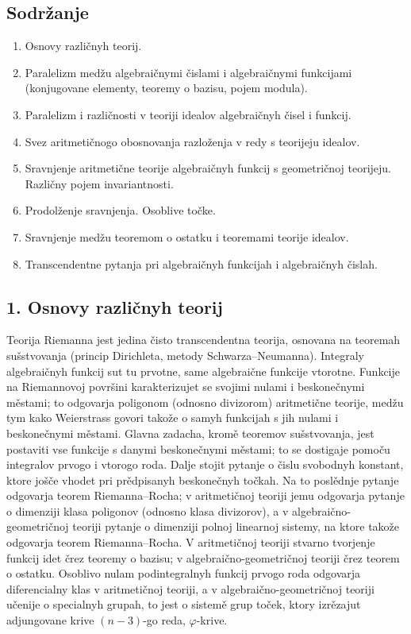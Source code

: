 \documentclass[11pt]{article}
\begin{document}
\subsection*{Sodržanje}
\begin{enumerate}
\item Osnovy različnyh teorij.
\item Paralelizm medžu algebraičnymi čislami i algebraičnymi funkcijami (konjugovane elementy, teoremy o bazisu, pojem modula).
\item Paralelizm i različnosti v teoriji idealov algebraičnyh čisel i funkcij.
\item Svez aritmetičnogo obosnovanja razloženja v redy s teorijeju idealov.
\item Sravnjenje aritmetične teorije algebraičnyh funkcij s geometričnoj teorijeju. Različny pojem invariantnosti.
\item Prodolženje sravnjenja. Osoblive točke.
\item Sravnjenje medžu teoremom o ostatku i teoremami teorije idealov.
\item Transcendentne pytanja pri algebraičnyh funkcijah i algebraičnyh čislah.
\end{enumerate}

\subsection*{1. Osnovy različnyh teorij}
Teorija Riemanna jest jedina čisto transcendentna teorija, osnovana na teoremah sušstvovanja (princip Dirichleta, metody Schwarza--Neumanna). Integraly algebraičnyh funkcij sut tu prvotne, same algebraične funkcije vtorotne. Funkcije na Riemannovoj površini karakterizujet se svojimi nulami i beskonečnymi městami; to odgovarja poligonom (odnosno divizorom) aritmetične teorije, medžu tym kako Weierstrass govori takože o samyh funkcijah s jih nulami i beskonečnymi městami. Glavna zadacha, kromě teoremov sušstvovanja, jest postaviti vse funkcije s danymi beskonečnymi městami; to se dostigaje pomoču integralov prvogo i vtorogo roda. Dalje stojit pytanje o čislu svobodnyh konstant, ktore jošče vhodet pri prědpisanyh beskonečnyh točkah. Na to poslědnje pytanje odgovarja teorem Riemanna--Rocha; v aritmetičnoj teoriji jemu odgovarja pytanje o dimenziji klasa poligonov (odnosno klasa divizorov), a v algebraično-geometričnoj teoriji pytanje o dimenziji polnoj linearnoj sistemy, na ktore takože odgovarja teorem Riemanna--Rocha. V aritmetičnoj teoriji stvarno tvorjenje funkcij idet črez teoremy o bazisu; v algebraično-geometričnoj teoriji črez teorem o ostatku. Osoblivo nulam podintegralnyh funkcij prvogo roda odgovarja diferencialny klas v aritmetičnoj teoriji, a v algebraično-geometričnoj teoriji učenije o specialnyh grupah, to jest o sistemě grup toček, ktory izrězajut adjungovane krive \((n-3)\)-go reda, \(\varphi\)-krive.
\end{document}
